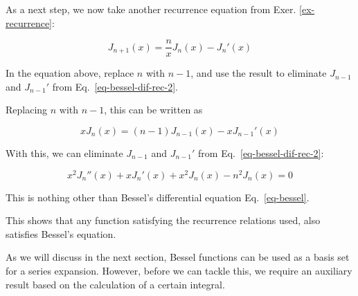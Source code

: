 As a next step, we now take another recurrence equation from Exer. \ref{ex-recurrence}:

\begin{equation}
J_{n+1}(x) = \frac{n}{x}J_n(x) - J_n'(x)
\end{equation} 

\begin{cue}
In the equation above, replace $n$ with $n-1$, and use the result to eliminate $J_{n-1}$ and $J_{n-1}'$ from Eq.~\ref{eq-bessel-dif-rec-2}.
\end{cue}

Replacing $n$ with $n-1$, this can be written as

\begin{equation}
x J_{n}(x) = (n-1)J_{n-1}(x) - x J_{n-1}'(x)
\end{equation} 

With this, we can eliminate $J_{n-1}$ and $J_{n-1}'$ from Eq.~\ref{eq-bessel-dif-rec-2}:

\begin{equation}
x^2 J_n''(x) +  x J_n'(x) + x^2 J_n(x) - n^2 J_n(x) = 0
\end{equation} 

This is nothing other than Bessel's differential equation Eq.~\ref{eq-bessel}.

This shows that any function satisfying the recurrence relations used, also satisfies Bessel's equation.


\pagebreak



As we will discuss in the next section, Bessel functions can be used as a basis set for a series expansion. However, before we can tackle this, we require an auxiliary result based on the calculation of a certain integral.


